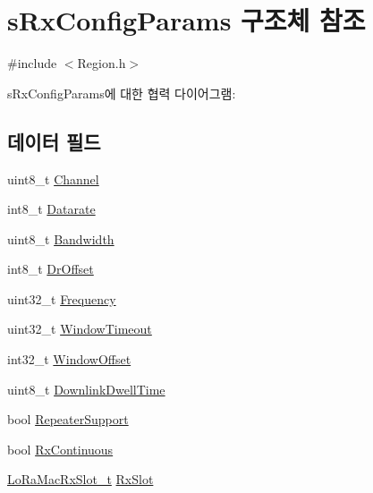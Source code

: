 \hypertarget{structs_rx_config_params}{}\section{s\+Rx\+Config\+Params 구조체 참조}
\label{structs_rx_config_params}


{\ttfamily \#include $<$Region.\+h$>$}



s\+Rx\+Config\+Params에 대한 협력 다이어그램\+:
\subsection*{데이터 필드}
\begin{DoxyCompactItemize}
\item 
uint8\+\_\+t \mbox{\hyperlink{structs_rx_config_params_a1ca6f01ca18afe402de51babe8c95f5e}{Channel}}
\item 
int8\+\_\+t \mbox{\hyperlink{structs_rx_config_params_ae2f6080f3aa0e9485c55513ca56bb24d}{Datarate}}
\item 
uint8\+\_\+t \mbox{\hyperlink{structs_rx_config_params_aa8fc32e4883d30642e0ceb5845006a57}{Bandwidth}}
\item 
int8\+\_\+t \mbox{\hyperlink{structs_rx_config_params_ad920e18a48423b1eb1fe40d1b2b082d4}{Dr\+Offset}}
\item 
uint32\+\_\+t \mbox{\hyperlink{structs_rx_config_params_ade3d190636488dad9a89b19446b7acf1}{Frequency}}
\item 
uint32\+\_\+t \mbox{\hyperlink{structs_rx_config_params_a9d9f6c16ea62e2bcc09b100e2cb83e3f}{Window\+Timeout}}
\item 
int32\+\_\+t \mbox{\hyperlink{structs_rx_config_params_a9d092276960345e3b06ba105cf0c8b98}{Window\+Offset}}
\item 
uint8\+\_\+t \mbox{\hyperlink{structs_rx_config_params_a63074ce7d23ff98956f5d6f4054f235f}{Downlink\+Dwell\+Time}}
\item 
bool \mbox{\hyperlink{structs_rx_config_params_a037bdbc41e8b3deeaab3684cf4b23f66}{Repeater\+Support}}
\item 
bool \mbox{\hyperlink{structs_rx_config_params_ad155d9bae95f09d927ca588dc4f4734a}{Rx\+Continuous}}
\item 
\mbox{\hyperlink{group___l_o_r_a_m_a_c_ga082bd3322087fa2f42c902a0b360ff4f}{Lo\+Ra\+Mac\+Rx\+Slot\+\_\+t}} \mbox{\hyperlink{structs_rx_config_params_a0a258bf8cfad5219bfd579257e523fc1}{Rx\+Slot}}
\end{DoxyCompactItemize}


